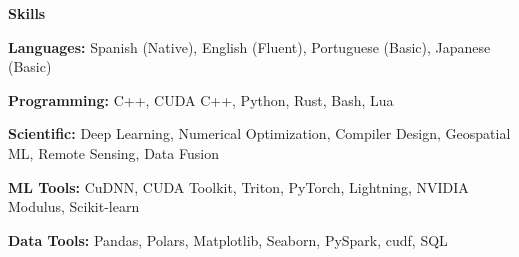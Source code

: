 \documentclass[11pt]{article}
\begin{document}
\begin{center}
    \textbf{Skills}
\end{center}

\textbf{Languages:} Spanish (Native), English (Fluent), Portuguese (Basic), Japanese (Basic)

\textbf{Programming:} C++, CUDA C++, Python, Rust, Bash, Lua

\textbf{Scientific:} Deep Learning, Numerical Optimization, Compiler Design, Geospatial ML, Remote Sensing, Data Fusion

\textbf{ML Tools:} CuDNN, CUDA Toolkit, Triton, PyTorch, Lightning, NVIDIA Modulus, Scikit-learn

\textbf{Data Tools:} Pandas, Polars, Matplotlib, Seaborn, PySpark, cudf, SQL
\end{document}
